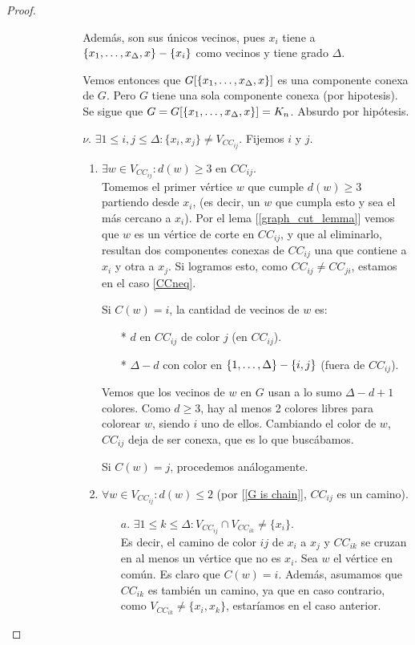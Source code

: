 \begin{proof}
\begin{enumerate}
\begin{enumerate}
\begin{enumerate}
\begin{itemize}
        Además, son sus únicos vecinos, pues $x_i$ tiene a $\{x_1, \mathellipsis, x_\Delta, x\} - \{x_i\}$ como vecinos y tiene grado $\Delta$.
        
        Vemos entonces que $G[\{x_1, \mathellipsis, x_\Delta, x\}]$ es una componente conexa de $G$. Pero $G$ tiene una sola componente conexa (por hipotesis). Se sigue que $G = G[\{x_1,\mathellipsis,x_\Delta, x\}] = K_n$. Absurdo por hipótesis.

        \item[$\nu.$] \label{nu} $\exists 1 \le i,j \le \Delta \colon \{x_i,x_j\} \neq V_{CC_{ij}}$. Fijemos $i$ y $j$.
        \begin{enumerate}
            \item $\exists w \in V_{CC_{ij}} \colon d(w) \ge 3$  en $CC_{ij}$.\\
            Tomemos el primer vértice $w$ que cumple $d(w) \ge 3$ partiendo desde $x_i$, (es decir, un $w$ que cumpla esto y sea el más cercano a $x_i$). Por el lema [\ref{graph_cut_lemma}] vemos que $w$ es un vértice de corte en $CC_{ij}$, y que al eliminarlo, resultan dos componentes conexas de $CC_{ij}$ una que contiene a $x_i$ y otra a $x_j$. Si logramos esto, como $CC_{ij} \neq CC_{ji}$, estamos en el caso \ref{CCneq}.
            
            Si $C(w) = i$, la cantidad de vecinos de $w$ es:
            \begin{itemize}
                \item[*] $d$ en $CC_{ij}$ de color $j$ (en $CC_{ij}$).
                \item[*] $\Delta - d$ con color en $\{1, \mathellipsis, \Delta\} - \{i,j\}$ (fuera de $CC_{ij}$).
            \end{itemize}
        Vemos que los vecinos de $w$ en $G$ usan a lo sumo $\Delta - d + 1$ colores.
        Como $d \ge 3$, hay al menos 2 colores libres para colorear $w$, siendo $i$ uno de ellos. Cambiando el color de $w$, $CC_{ij}$ deja de ser conexa, que es lo que buscábamos.
        
        Si $C(w) = j$, procedemos análogamente.\\
    
        \item $\forall w \in V_{CC_{ij}} \colon d(w) \le 2$ (por [\ref{G is chain}], $CC_{ij}$ es un camino).
        \begin{itemize}
            \item[$a.$] \label{CCdisjoint} $\exists 1 \le k \le \Delta \colon V_{CC_{ij}} \cap V_{CC_{ik}} \neq \{x_i\}$.\\
            Es decir, el camino de color $ij$ de $x_i$ a $x_j$ y $CC_{ik}$ se cruzan en al menos un vértice que no es $x_i$. Sea $w$ el vértice en común. Es claro que $C(w) = i$. Además, asumamos que $CC_{ik}$ es también un camino, ya que en caso contrario, como $V_{CC_{ik}} \neq \{x_i, x_k\}$, estaríamos en el caso anterior.
            

\end{itemize}
\end{enumerate}
\end{itemize}
\end{enumerate}
\end{enumerate}
\end{enumerate}
\end{proof}
